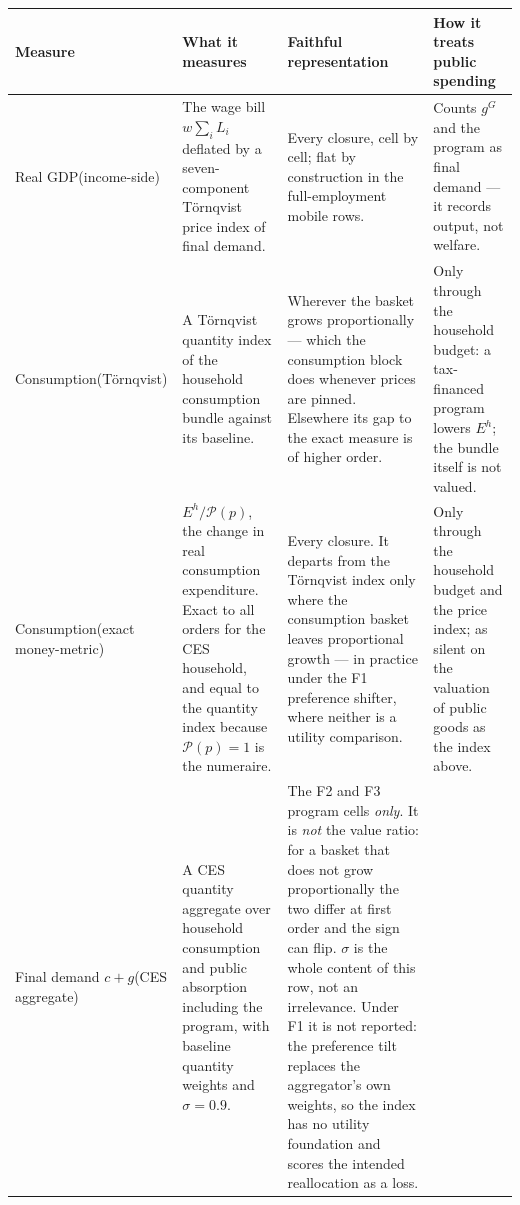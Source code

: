 \begin{table}[htbp]
\centering
\footnotesize
\setlength{\tabcolsep}{3pt}
\renewcommand{\arraystretch}{1.25}
\begin{tabular}{@{}>{\raggedright\arraybackslash}p{1.85cm}>{\raggedright\arraybackslash}p{3.9cm}>{\raggedright\arraybackslash}p{4.3cm}>{\raggedright\arraybackslash}p{4.3cm}@{}}
\toprule
\textbf{Measure} & \textbf{What it measures} & \textbf{Faithful representation} & \textbf{How it treats public spending} \\
\midrule
Real GDP\newline \scriptsize (income-side)
& The wage bill $w\sum_i L_i$ deflated by a seven-component T\"ornqvist price index of final demand.
& Every closure, cell by cell; flat by construction in the full-employment mobile rows.
& Counts $g^G$ and the program as final demand --- it records output, not welfare. \\
Consumption\newline \scriptsize (T\"ornqvist)
& A T\"ornqvist quantity index of the household consumption bundle against its baseline.
& Wherever the basket grows proportionally --- which the consumption block does whenever prices are pinned. Elsewhere its gap to the exact measure is of higher order.
& Only through the household budget: a tax-financed program lowers $E^h$; the bundle itself is not valued. \\
Consumption\newline \scriptsize (exact money-metric)
& $E^h/\mathcal{P}(p)$, the change in real consumption expenditure. Exact to all orders for the CES household, and equal to the quantity index because $\mathcal{P}(p)=1$ is the numeraire.
& Every closure. It departs from the T\"ornqvist index only where the consumption basket leaves proportional growth --- in practice under the F1 preference shifter, where neither is a utility comparison.
& Only through the household budget and the price index; as silent on the valuation of public goods as the index above. \\
Final demand $c+g$\newline \scriptsize (CES aggregate)
& A CES quantity aggregate over household consumption and public absorption including the program, with baseline quantity weights and $\sigma=0.9$.
& The F2 and F3 program cells \emph{only}. It is \emph{not} the value ratio: for a basket that does not grow proportionally the two differ at first order and the sign can flip. $\sigma$ is the whole content of this row, not an irrelevance. Under F1 it is not reported: the preference tilt replaces the aggregator's own weights, so the index has no utility foundation and scores the intended reallocation as a loss.

\end{tabular}
\end{table}

